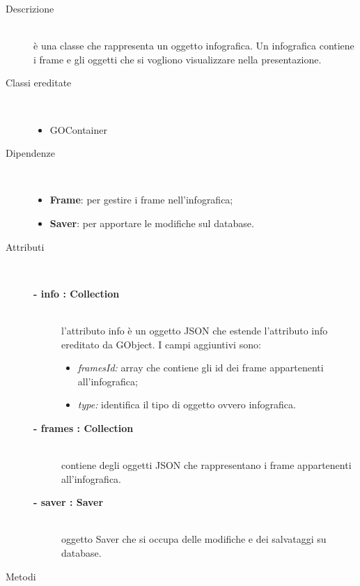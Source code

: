 \begin{description}
\item[Descrizione] \hfill \\
	è una classe che rappresenta un oggetto infografica. Un infografica contiene i frame e gli oggetti che si vogliono visualizzare nella presentazione.
	
\item[Classi ereditate] \hfill \\
	\begin{itemize}
		\item GOContainer
	\end{itemize}
	
\item[Dipendenze] \hfill \\
	\begin{itemize}
		\item \textbf{Frame}: per gestire i frame nell'infografica;
		\item \textbf{Saver}: per apportare le modifiche sul database.
	\end{itemize}	
	
\item[Attributi] \hfill \\
	\begin{description}
		\item[\textbf{- info : Collection			}] \hfill \\
			l'attributo info è un oggetto JSON che estende l'attributo info ereditato da GObject. I campi aggiuntivi sono:
	\begin{itemize}
		\item \textit{framesId:} array che contiene gli id dei frame appartenenti all'infografica;
		\item \textit{type:} identifica il tipo di oggetto ovvero infografica.		
	\end{itemize}
		\item[\textbf{- frames : Collection			}] \hfill \\
			contiene degli oggetti JSON che rappresentano i frame appartenenti all'infografica.
		\item[\textbf{- saver : Saver			}] \hfill \\
			oggetto Saver che si occupa delle modifiche e dei salvataggi su database.
	\end{description}	
	
\item[Metodi] \hfill \\


\end{description}
